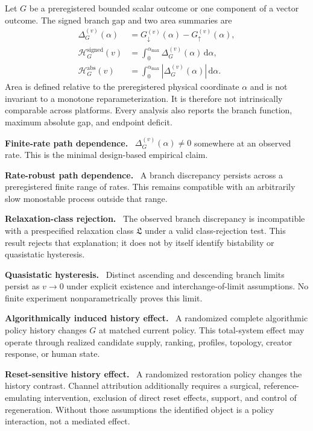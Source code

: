 \documentclass[10pt,a4paper]{article}
\newcommand{\alphamax}{\alpha_{\max}}
\newcommand{\dd}{\mathrm{d}}
\newcommand{\inlinehead}[1]{\par\smallskip\noindent\textbf{#1}\ }
\begin{document}
Let $G$ be a preregistered bounded scalar outcome or one component of a vector outcome. The signed branch gap and two area summaries are
\begin{align}
\Delta_G^{(v)}(\alpha)
  &=G_{\downarrow}^{(v)}(\alpha)-G_{\uparrow}^{(v)}(\alpha),\\
\mathcal H_G^{\mathrm{signed}}(v)
  &=\int_{0}^{\alphamax}\Delta_G^{(v)}(\alpha)\,\dd\alpha,\\
\mathcal H_G^{\mathrm{abs}}(v)
  &=\int_{0}^{\alphamax}|\Delta_G^{(v)}(\alpha)|\,\dd\alpha.
\end{align}
Area is defined relative to the preregistered physical coordinate $\alpha$ and is not invariant to a monotone reparameterization. It is therefore not intrinsically comparable across platforms. Every analysis also reports the branch function, maximum absolute gap, and endpoint deficit.

\inlinehead{Finite-rate path dependence.} $\Delta_G^{(v)}(\alpha)\neq0$ somewhere at an observed rate. This is the minimal design-based empirical claim.

\inlinehead{Rate-robust path dependence.} A branch discrepancy persists across a preregistered finite range of rates. This remains compatible with an arbitrarily slow monostable process outside that range.

\inlinehead{Relaxation-class rejection.} The observed branch discrepancy is incompatible with a prespecified relaxation class $\mathfrak L$ under a valid class-rejection test. This result rejects that explanation; it does not by itself identify bistability or quasistatic hysteresis.

\inlinehead{Quasistatic hysteresis.} Distinct ascending and descending branch limits persist as $v\rightarrow0$ under explicit existence and interchange-of-limit assumptions. No finite experiment nonparametrically proves this limit.

\inlinehead{Algorithmically induced history effect.} A randomized complete algorithmic policy history changes $G$ at matched current policy. This total-system effect may operate through realized candidate supply, ranking, profiles, topology, creator response, or human state.

\inlinehead{Reset-sensitive history effect.} A randomized restoration policy changes the history contrast. Channel attribution additionally requires a surgical, reference-emulating intervention, exclusion of direct reset effects, support, and control of regeneration. Without those assumptions the identified object is a policy interaction, not a mediated effect.
\end{document}
